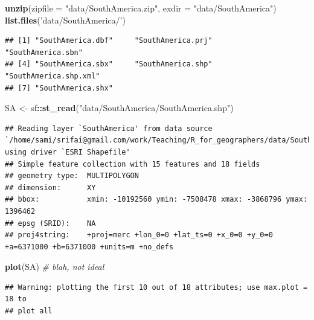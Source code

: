 \documentclass[]{article}
\newenvironment{Shaded}{\begin{snugshade}}{\end{snugshade}}
\newcommand{\CommentTok}[1]{\textcolor[rgb]{0.56,0.35,0.01}{\textit{#1}}}
\newcommand{\DataTypeTok}[1]{\textcolor[rgb]{0.13,0.29,0.53}{#1}}
\newcommand{\KeywordTok}[1]{\textcolor[rgb]{0.13,0.29,0.53}{\textbf{#1}}}
\newcommand{\NormalTok}[1]{#1}
\newcommand{\OperatorTok}[1]{\textcolor[rgb]{0.81,0.36,0.00}{\textbf{#1}}}
\newcommand{\StringTok}[1]{\textcolor[rgb]{0.31,0.60,0.02}{#1}}
\begin{document}
\begin{Shaded}
\begin{Highlighting}[]
\KeywordTok{unzip}\NormalTok{(}\DataTypeTok{zipfile =} \StringTok{"data/SouthAmerica.zip"}\NormalTok{, }\DataTypeTok{exdir =} \StringTok{"data/SouthAmerica"}\NormalTok{)}
\KeywordTok{list.files}\NormalTok{(}\StringTok{'data/SouthAmerica/'}\NormalTok{)}
\end{Highlighting}
\end{Shaded}

\begin{verbatim}
## [1] "SouthAmerica.dbf"     "SouthAmerica.prj"     "SouthAmerica.sbn"    
## [4] "SouthAmerica.sbx"     "SouthAmerica.shp"     "SouthAmerica.shp.xml"
## [7] "SouthAmerica.shx"
\end{verbatim}

\begin{Shaded}
\begin{Highlighting}[]
\NormalTok{SA <-}\StringTok{ }\NormalTok{sf}\OperatorTok{::}\KeywordTok{st_read}\NormalTok{(}\StringTok{"data/SouthAmerica/SouthAmerica.shp"}\NormalTok{)}
\end{Highlighting}
\end{Shaded}

\begin{verbatim}
## Reading layer `SouthAmerica' from data source `/home/sami/srifai@gmail.com/work/Teaching/R_for_geographers/data/SouthAmerica/SouthAmerica.shp' using driver `ESRI Shapefile'
## Simple feature collection with 15 features and 18 fields
## geometry type:  MULTIPOLYGON
## dimension:      XY
## bbox:           xmin: -10192560 ymin: -7508478 xmax: -3868796 ymax: 1396462
## epsg (SRID):    NA
## proj4string:    +proj=merc +lon_0=0 +lat_ts=0 +x_0=0 +y_0=0 +a=6371000 +b=6371000 +units=m +no_defs
\end{verbatim}

\begin{Shaded}
\begin{Highlighting}[]
\KeywordTok{plot}\NormalTok{(SA) }\CommentTok{# blah, not ideal}
\end{Highlighting}
\end{Shaded}

\begin{verbatim}
## Warning: plotting the first 10 out of 18 attributes; use max.plot = 18 to
## plot all
\end{verbatim}
\end{document}
